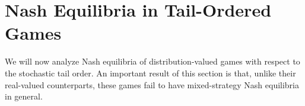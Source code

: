 \documentclass[a4paper]{scrreprt}
\theoremstyle{definition}
\begin{document}
%    
     
    
    \section{Nash Equilibria in Tail-Ordered Games}
    \label{sec:equilibriaInTailOrderedGames}
    We will now analyze Nash equilibria of distribution-valued games with respect to the stochastic tail order.
    An important result of this section is that, unlike their real-valued counterparts, these games fail to have mixed-strategy Nash equilibria in general.
    
\end{document}
